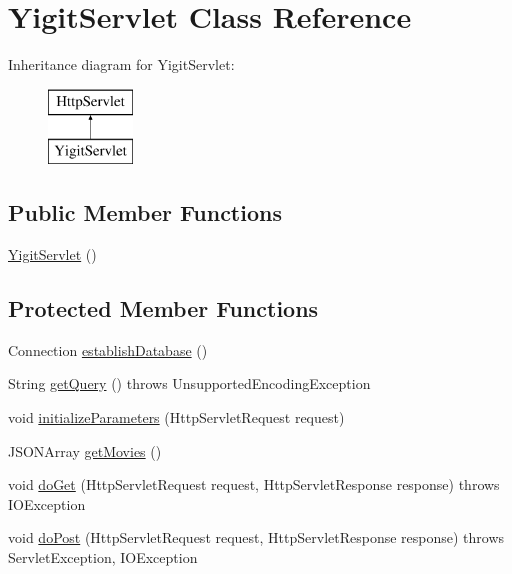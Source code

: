 \hypertarget{class_yigit_servlet}{}\section{Yigit\+Servlet Class Reference}
\label{class_yigit_servlet}
Inheritance diagram for Yigit\+Servlet\+:\begin{figure}[H]
\begin{center}
\leavevmode
\includegraphics[height=2.000000cm]{class_yigit_servlet}
\end{center}
\end{figure}
\subsection*{Public Member Functions}
\begin{DoxyCompactItemize}
\item 
\hyperlink{class_yigit_servlet_a2cf35716343b40ed5d31bc20bd0e4281}{Yigit\+Servlet} ()
\end{DoxyCompactItemize}
\subsection*{Protected Member Functions}
\begin{DoxyCompactItemize}
\item 
Connection \hyperlink{class_yigit_servlet_afbf5525cf34aecfbc5c2d7c0a5398d45}{establish\+Database} ()
\item 
String \hyperlink{class_yigit_servlet_a03f680ab69c811ba4bb6024bb172c783}{get\+Query} ()  throws Unsupported\+Encoding\+Exception
\item 
void \hyperlink{class_yigit_servlet_a67dcab9984048772508f806eec206392}{initialize\+Parameters} (Http\+Servlet\+Request request)
\item 
J\+S\+O\+N\+Array \hyperlink{class_yigit_servlet_acb708f5a65546d97991965287c3f226d}{get\+Movies} ()
\item 
void \hyperlink{class_yigit_servlet_a87f5660fd804020140513bfd608a1fad}{do\+Get} (Http\+Servlet\+Request request, Http\+Servlet\+Response response)  throws I\+O\+Exception  
\item 
void \hyperlink{class_yigit_servlet_a6b23eda49b2fe7abb63786c20fe01d75}{do\+Post} (Http\+Servlet\+Request request, Http\+Servlet\+Response response)  throws Servlet\+Exception, I\+O\+Exception 
\end{DoxyCompactItemize}


